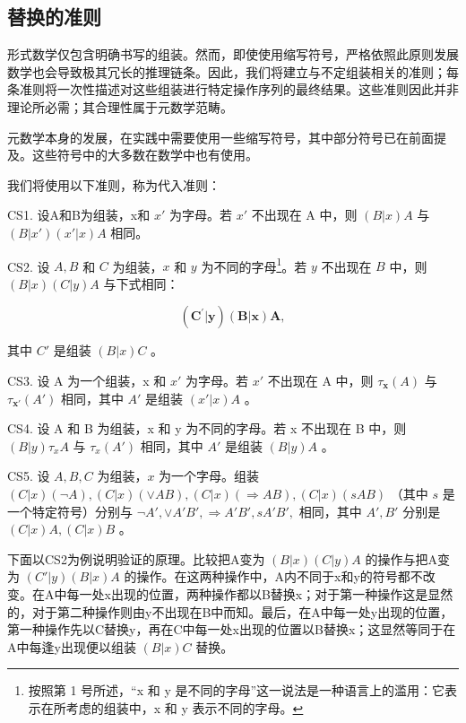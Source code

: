 \subsection{替换的准则}

形式数学仅包含明确书写的组装。然而，即使使用缩写符号，严格依照此原则发展数学也会导致极其冗长的推理链条。因此，我们将建立与不定组装相关的准则；每条准则将一次性描述对这些组装进行特定操作序列的最终结果。这些准则因此并非理论所必需；其合理性属于元数学范畴。

元数学本身的发展，在实践中需要使用一些缩写符号，其中部分符号已在前面提及。这些符号中的大多数在数学中也有使用。

我们将使用以下准则，称为代入准则：

CS1. 设A和B为组装，x和 \(x'\) 为字母。若 \(x'\) 不出现在 A 中，则 \((B|x)A\) 与 \((B|x')(x'|x)A\) 相同。

CS2. 设 \(A, B\) 和 \(C\) 为组装，\(x\) 和 \(y\) 为不同的字母\footnote{按照第 1 号所述，“x 和 y 是不同的字母”这一说法是一种语言上的滥用：它表示在所考虑的组装中，x 和 y 表示不同的字母。}。若 \(y\) 不出现在 \(B\) 中，则 \((B|x)(C|y)A\) 与下式相同：

\[
\left(\boldsymbol {C} ^ {\prime} | \boldsymbol {y}\right) (\boldsymbol {B} | \boldsymbol {x}) \boldsymbol {A},
\]

其中 \(C'\) 是组装 \((B|x)C\) 。

CS3. 设 A 为一个组装，x 和 \(x'\) 为字母。若 \(x'\) 不出现在 A 中，则 \(\tau_{\mathbf{x}}(A)\) 与 \(\tau_{\mathbf{x}'}(A')\) 相同，其中 \(A'\) 是组装 \((x'|x)A\) 。

CS4. 设 A 和 B 为组装，x 和 y 为不同的字母。若 x 不出现在 B 中，则 \((B|y)\tau_{x}A\) 与 \(\tau_{x}(A')\) 相同，其中 \(A'\) 是组装 \((B|y)A\) 。

CS5. 设 \(A, B, C\) 为组装，\(x\) 为一个字母。组装 \((C|x) (\neg A), (C|x) (\vee AB), (C|x) (\Longrightarrow AB), (C|x) (sAB)\) （其中 \(s\) 是一个特定符号）分别与 \(\neg A', \vee A'B', \Longrightarrow A'B', sA'B',\) 相同，其中 \(A', B'\) 分别是 \((C|x) A, (C|x) B\) 。

下面以CS2为例说明验证的原理。比较把A变为 \((B|x)(C|y)A\) 的操作与把A变为 \((C'|y)(B|x)A\) 的操作。在这两种操作中，A内不同于x和y的符号都不改变。在A中每一处x出现的位置，两种操作都以B替换x；对于第一种操作这是显然的，对于第二种操作则由y不出现在B中而知。最后，在A中每一处y出现的位置，第一种操作先以C替换y，再在C中每一处x出现的位置以B替换x；这显然等同于在A中每逢y出现便以组装 \((B|x)C\) 替换。

